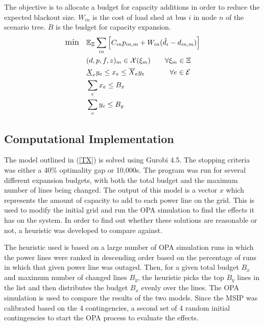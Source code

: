 The objective is to allocate a budget for capacity additions in order to reduce the expected blackout size.  $W_{in}$ is the cost of load shed at bus $i$ in node $n$ of the scenario tree.  $B$ is the budget for capacity expansion.
\begin{subequations}

\begin{align} \displaystyle
	{\large \mbox{min}} \hspace{10px} &  \Expect_\Xi \sum_{in} \left[ C_{in}  p_{in,m}  + W_{in} (\hat{d}_{i} - d_{in,m}) \right]	\\
	&(d,p,f,z)_m  \in \cX(\xi_m)    \hspace{20px}   \forall \xi_m \in \Xi	\\
	& \underline{X}_e y_e \le x_e \le \overline{X}_e y_e \hspace{35px} \forall e \in \cE\\
	&\sum_e x_e \le B_x 	\\
	& \sum_e y_e \le B_y  
\end{align}
\label{TX}
\end{subequations}



\subsection{Computational Implementation}
The model outlined in (\ref{TX}) is solved using Gurobi 4.5.  The stopping criteria was either a 40\% optimality gap or 10,000s.  The program was run for several different expansion budgets, with both the total budget and the maximum number of lines being changed.  The output of this model is a vector $x$ which represents the amount of capacity to add to each power line on the grid.  This is used to modify the initial grid and run the OPA simulation to find the effects it has on the system.  In order to find out whether these solutions are reasonable or not, a heuristic was developed to compare against.

The heuristic used is based on a large number of OPA simulation runs in which the power lines were ranked in descending order based on the percentage of runs in which that given power line was outaged.  Then, for a given total budget $B_x$ and maximum number of changed lines $B_y$, the heuristic picks the top $B_y$ lines in the list and then distributes the budget $B_x$ evenly over the lines.  The OPA simulation is used to compare the results of the two models.  Since the MSIP was calibrated based on the 4 contingencies, a second set of 4 random initial contingencies to start the OPA process to evaluate the effects.




